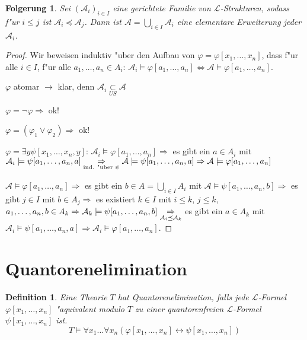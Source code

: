 \documentclass[a4paper,12pt,numbers=noenddot,parskip=full]{scrartcl}
\newcommand{\scrL}{\mathcal{L}}
\newcommand{\scrA}{\mathcal{A}}
\theoremstyle{dotless}
\newtheorem{corollary}[theorem]{Folgerung}
\newtheorem{definition}[theorem]{Definition}
\theoremstyle{remark}
\begin{document}
\begin{corollary}
	Sei $(\scrA_i)_{i \in I}$ eine gerichtete Familie von $\scrL$-Strukturen, sodass f"ur $i \leq j$ ist $\scrA_i \preceq \scrA_j$. Dann ist $\scrA = \underset{i \in I}{\bigcup} \scrA_i$ eine elementare Erweiterung jeder $\scrA_i$.
\end{corollary}
\begin{proof}
	Wir beweisen induktiv "uber den Aufbau von $\varphi=\varphi[x_1, \dots, x_n]$, dass f"ur alle $i \in I$, f"ur alle $a_1, \dots, a_n \in A_i$: $\scrA_i \models \varphi[a_1, \dots, a_n] \Leftrightarrow \scrA \models \varphi[a_1, \dots, a_n]$.
	
	$\varphi$ atomar $\rightarrow$ klar, denn $\scrA_i \underset{US}{\subset} \scrA$
	
	$\varphi = \lnot \varphi \Rightarrow$ ok!
	
	$\varphi = (\varphi_1 \lor \varphi_2) \Rightarrow$ ok!
	
	$\varphi = \exists y \psi[x_1, \dots, x_n, y]$: $\scrA_i\models \varphi[a_1, \dots, a_n] \Rightarrow$ es gibt ein $a \in A_i$ mit $\scrA_i\models \psi[a_1, \dots,a_n, a] \\
	\underset{\text{ind. "uber }\psi}{\Rightarrow} \scrA \models \psi[a_1, \dots, a_n, a] \Rightarrow \scrA \models \varphi[a_1, \dots, a_n]$
	
	$\scrA \models \varphi[a_1, \dots, a_n] \Rightarrow$ es gibt ein $b \in A = \underset{i \in I}{\bigcup} A_i$ mit $\scrA \models \psi[a_1, \dots, a_n, b] \Rightarrow$ es gibt $j \in I$ mit $b \in A_j \Rightarrow$ es existiert $k \in I$ mit $i \leq k$, $j \leq k$, $a_1, \dots, a_n, b \in A_k \\
	\Rightarrow \scrA_k \models \psi[a_1, \dots, a_n, b] \underset{\scrA_i \preceq \scrA_k}{\Rightarrow}$ es gibt ein $a \in A_k$ mit $\scrA_i \models \psi[a_1, \dots, a_n, a] \Rightarrow {\scrA_i \models \varphi[a_1, \dots, a_n]}$.
\end{proof}

\section{Quantorenelimination}
\begin{definition}
	Eine Theorie $T$ hat Quantorenelimination, falls jede $\scrL$-Formel $\varphi[x_1, \dots, x_n]$ "aquivalent modulo $T$ zu einer quantorenfreien $\scrL$-Formel $\psi[x_1, \dots, x_n]$ ist.
	\begin{equation*}
		T \models \forall x_1 \dots \forall x_n (\varphi[x_1, \dots, x_n] \leftrightarrow \psi[x_1, \dots, x_n])
	\end{equation*}
\end{definition}
\end{document}
